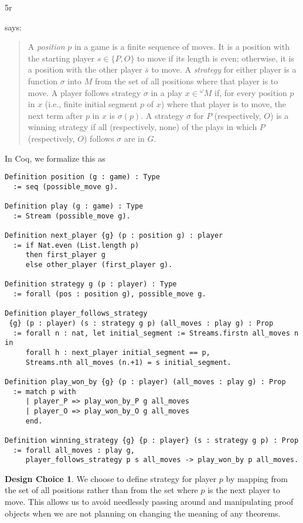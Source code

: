 5r\documentclass{article}
\theoremstyle{definition}
\newtheorem*{designchoice}{Design Choice}
\begin{document}
\textcite[p.~187]{Blass1992} says: 
\begin{quote}
A \emph{position} $p$ in a game is a finite sequence of moves. It is a position with the starting player $s \in \{P, O\}$ to move if its length is even; otherwise, it is a position with the other player $\bar s$ to move. A \emph{strategy} for either player is a function $\sigma$ into $M$ from the set of all positions where that player is to move. A player follows strategy $\sigma$ in a play $x \in {}^\omega M$ if, for every position $p$ in $x$ (i.e., finite initial segment $p$ of $x$) where that player is to move, the next term after $p$ in $x$ is $\sigma (p)$. A strategy $\sigma$ for $P$ (respectively, $O$) is a winning strategy if all (respectively, none) of the plays in which $P$ (respectively, $O$) follows $\sigma$ are in $G$. 
\end{quote}

In Coq, we formalize this as
\begin{verbatim}
Definition position (g : game) : Type
  := seq (possible_move g).

Definition play (g : game) : Type
  := Stream (possible_move g).

Definition next_player {g} (p : position g) : player
  := if Nat.even (List.length p)
     then first_player g
     else other_player (first_player g).

Definition strategy g (p : player) : Type
  := forall (pos : position g), possible_move g.

Definition player_follows_strategy
 {g} (p : player) (s : strategy g p) (all_moves : play g) : Prop
  := forall n : nat, let initial_segment := Streams.firstn all_moves n in 
     forall h : next_player initial_segment == p, 
     Streams.nth all_moves (n.+1) = s initial_segment.

Definition play_won_by {g} (p : player) (all_moves : play g) : Prop
  := match p with
     | player_P => play_won_by_P g all_moves
     | player_O => play_won_by_O g all_moves
     end.

Definition winning_strategy {g} {p : player} (s : strategy g p) : Prop
  := forall all_moves : play g,
     player_follows_strategy p s all_moves -> play_won_by p all_moves. 
\end{verbatim}

\begin{designchoice}
We choose to define strategy for player $p$ by mapping from the set of all positions rather than from the set where $p$ is the next player to move. This allows us to avoid needlessly passing around and manipulating proof objects when we are not planning on changing the meaning of any theorems. 
\end{designchoice}
\end{document}
